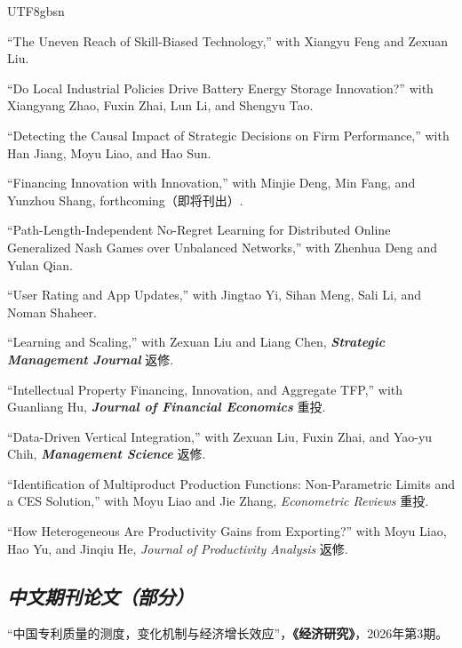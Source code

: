 \documentclass[letterpaper]{article}
\begin{document}
\begin{CJK}{UTF8}{gbsn}
\begin{papers}
\item ``The Uneven Reach of Skill-Biased Technology,'' with Xiangyu Feng and Zexuan Liu.

\item ``Do Local Industrial Policies Drive Battery Energy Storage Innovation?'' with Xiangyang Zhao, Fuxin Zhai, Lun Li, and Shengyu Tao.

\item ``Detecting the Causal Impact of Strategic Decisions on Firm Performance,'' with Han Jiang, Moyu Liao, and Hao Sun.

\item ``Financing Innovation with Innovation,'' with Minjie Deng, Min Fang, and Yunzhou Shang, forthcoming（即将刊出）.

\item ``Path-Length-Independent No-Regret Learning for Distributed Online Generalized Nash Games over Unbalanced Networks,'' with Zhenhua Deng and Yulan Qian.

\item ``User Rating and App Updates,'' with Jingtao Yi, Sihan Meng, Sali Li, and Noman Shaheer.

\item ``Learning and Scaling,'' with Zexuan Liu and Liang Chen, \textbf{\textit{Strategic Management Journal}} 返修.

\item ``Intellectual Property Financing, Innovation, and Aggregate TFP,'' with Guanliang Hu, \textbf{\textit{Journal of Financial Economics}} 重投.

\item ``Data-Driven Vertical Integration,'' with Zexuan Liu, Fuxin Zhai, and Yao-yu Chih, \textbf{\textit{Management Science}} 返修.

\item ``Identification of Multiproduct Production Functions: Non-Parametric Limits and a CES Solution,'' with Moyu Liao and Jie Zhang, \textit{Econometric Reviews} 重投.

\item ``How Heterogeneous Are Productivity Gains from Exporting?'' with Moyu Liao, Hao Yu, and Jinqiu He, \textit{Journal of Productivity Analysis} 返修.
\end{papers}

\subsection*{\textit{中文期刊论文（部分）}}
\begin{papers}
\item “中国专利质量的测度，变化机制与经济增长效应”，\textbf{《经济研究》}，2026年第3期。


\end{papers}
\end{CJK}
\end{document}
